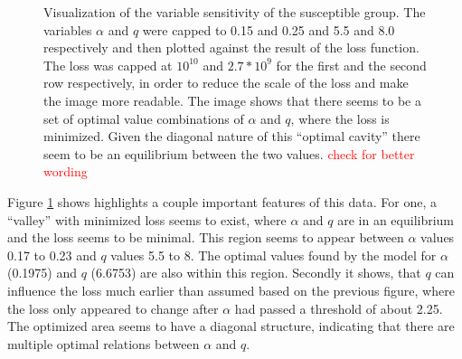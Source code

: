 \begin{figure}[h]
\begin{subfigure}[b]{0.4\textwidth}
	\end{subfigure}
	\caption{Visualization of the variable sensitivity of the susceptible group. The variables $\alpha$ and $q$ were
		capped to 0.15 and 0.25 and 5.5 and 8.0 respectively and then plotted against the result of the loss function.
		The loss was capped at $10^{10}$ and $2.7*10^{9}$ for the first and the second row respectively, in order to
		reduce the scale of the loss and make the image more readable. The image shows that there seems to be a set of
		optimal value combinations of $\alpha$ and $q$, where the loss is minimized. Given the diagonal nature of this
		``optimal cavity'' there seem to be an equilibrium between the two values.
		\textcolor{red}{check for better wording} %
		}
	\label{fig:sensitivity_zoom1}
\end{figure}

Figure \ref*{fig:sensitivity_zoom1} shows highlights a couple important features of this data. For one, a ``valley'' with minimized loss
seems to exist, where $\alpha$ and $q$ are in an equilibrium and the loss seems to be minimal. This region seems to
appear between $\alpha$ values 0.17 to 0.23 and $q$ values 5.5 to 8. The optimal values found by the model for $\alpha$
(0.1975) and $q$ (6.6753) are also within this region. Secondly it shows, that $q$ can influence the loss much earlier than assumed
based on the previous figure, where the loss only appeared to change after $\alpha$ had passed a threshold of about 2.25.
The optimized area seems to have a diagonal structure, indicating that there are multiple optimal relations between $\alpha$ and $q$.

